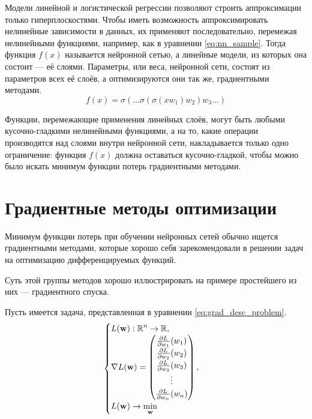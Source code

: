 Модели линейной и логистической регрессии позволяют строить аппроксимации только гиперплоскостями. Чтобы иметь возможность аппроксимировать нелинейные зависимости в данных, их применяют последовательно, перемежая нелинейными функциями, например, как в уравнении \ref*{eq:nn_sample}. Тогда функция $f(x)$ называется нейронной сетью, а линейные модели, из которых она состоит --- её слоями. Параметры, или веса, нейронной сети, состоят из параметров всех её слоёв, а оптимизируются они так же, градиентными методами.
\begin{equation}
    \label{eq:nn_sample}
    f(x)=\sigma(\dots \sigma(\sigma(xw_1)w_2)w_3 \dots)
\end{equation}

Функции, перемежающие применения линейных слоёв, могут быть любыми кусочно-гладкими нелинейными функциями, а на то, какие операции производятся над слоями внутри нейронной сети, накладывается только одно ограничение: функция $f(x)$ должна оставаться кусочно-гладкой, чтобы можно было искать минимум функции потерь градиентными методами.

\section{Градиентные методы оптимизации}

Минимум функции потерь при обучении нейронных сетей обычно ищется градиентными методами, которые хорошо себя зарекомендовали в решении задач на оптимизацию дифференцируемых функций.

Суть этой группы методов хорошо иллюстрировать на примере простейшего из них --- градиентного спуска.

Пусть имеется задача, представленная в уравнении \ref*{eq:grad_desc_problem}.
\begin{equation}
    \label{eq:grad_desc_problem}
    \begin{cases}
        L(\mathbf{w}): \operatorname{\mathbb{R}}^n \rightarrow \operatorname{\mathbb{R}}, \\
        \nabla L(\mathbf{w}) = \left(\begin{matrix}
            \frac{\partial L}{\partial w_1}(w_1) \\
            \frac{\partial L}{\partial w_2}(w_2) \\
            \frac{\partial L}{\partial w_3}(w_3) \\
            \vdots \\
            \frac{\partial L}{\partial w_n}(w_n)
        \end{matrix}\right), \\
        L(\mathbf{w}) \rightarrow \min\limits_\mathbf{w}
    \end{cases}
\end{equation}

